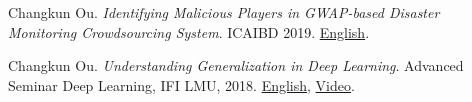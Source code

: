     \item{
      Changkun Ou.
      \emph{Identifying Malicious Players in GWAP-based Disaster Monitoring Crowdsourcing System}.
      ICAIBD 2019. \href{https://github.com/changkun/talks/blob/master/201905/gwap.pdf}{English}.
    }
    \item{
      Changkun Ou.
      \emph{Understanding Generalization in Deep Learning}.
      Advanced Seminar Deep Learning, IFI LMU, 2018. \href{https://docs.google.com/presentation/d/1eNUYH9_3bbBO7bONPU8BCTr2DOMC69gdOJvBgpLjwNg/edit#slide=id.g2cdf1dbd0b_1_6}{English}, \href{https://www.youtube.com/watch?v=z9je5YlnBgI&t=1585s}{Video}.
    }
\resumeSubHeadingListEnd
